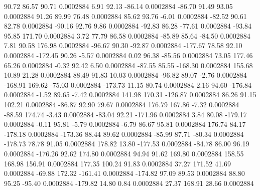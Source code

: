        90.72       86.57       90.71     0.0002884
        6.91       92.13      -86.14     0.0002884
      -86.70       91.49       93.05     0.0002884
       91.26       89.99       76.48     0.0002884
       85.62       93.76       -6.01     0.0002884
      -82.52       90.61       82.78     0.0002884
      -90.16       92.76        9.86     0.0002884
      -92.83       86.28      -77.61     0.0002884
      -93.84       95.85      171.70     0.0002884
        3.72       77.79       86.58     0.0002884
      -85.89       85.64      -84.50     0.0002884
        7.81       90.58      176.98     0.0002884
      -96.67       90.30      -92.87     0.0002884
     -177.67       78.58       92.10     0.0002884
     -172.45       90.26       -5.57     0.0002884
        0.02       96.38      -85.56     0.0002884
       73.05      177.46       65.26     0.0002884
       -0.32       92.42        6.50     0.0002884
      -87.55       85.55     -168.30     0.0002884
      155.68       10.89       21.28     0.0002884
       88.49       91.83       10.03     0.0002884
      -96.82       89.07       -2.76     0.0002884
     -168.91      169.62      -75.03     0.0002884
     -173.73       11.15       80.74     0.0002884
        2.16       94.60     -176.84     0.0002884
       -1.52       89.65       -7.42     0.0002884
      141.98      170.31     -126.87     0.0002884
       86.26       91.15      102.21     0.0002884
      -86.87       92.90       79.67     0.0002884
      176.79      167.86       -7.32     0.0002884
      -88.59      174.74       -3.43     0.0002884
      -83.04       92.21     -171.96     0.0002884
        3.84       80.08     -179.17     0.0002884
       -0.11       95.81       -5.79     0.0002884
       -6.79       86.67       95.81     0.0002884
      176.74       84.17     -178.18     0.0002884
     -173.36       88.44       89.62     0.0002884
      -85.99       87.71      -80.34     0.0002884
     -178.73       78.78       91.05     0.0002884
      178.82       13.80     -177.53     0.0002884
      -84.78       86.00       96.19     0.0002884
     -176.26       92.62      174.80     0.0002884
       94.94       91.62      169.80     0.0002884
      158.55      168.98      156.91     0.0002884
      177.35      100.24       91.83     0.0002884
       37.27      171.52       41.69     0.0002884
      -69.88      172.32     -161.41     0.0002884
     -174.82       97.09       89.53     0.0002884
       88.80       95.25      -95.40     0.0002884
     -179.82       14.80        0.84     0.0002884
       27.37      168.91       28.66     0.0002884
